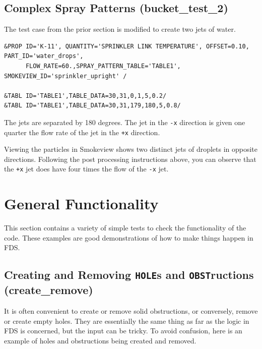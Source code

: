 \documentclass[11pt]{book}
\newcommand{\ct}{\tt\small}
\begin{document}
\normalsize \noindent


\subsection{Complex Spray Patterns ({\bf bucket\_test\_2}) }
\label{bucket_test_2}

The test case from the prior section is modified to create two jets of water.

\footnotesize
\begin{verbatim}
&PROP ID='K-11', QUANTITY='SPRINKLER LINK TEMPERATURE', OFFSET=0.10, PART_ID='water_drops',
      FLOW_RATE=60.,SPRAY_PATTERN_TABLE='TABLE1', SMOKEVIEW_ID='sprinkler_upright' /

&TABL ID='TABLE1',TABLE_DATA=30,31,0,1,5,0.2/
&TABL ID='TABLE1',TABLE_DATA=30,31,179,180,5,0.8/
\end{verbatim}
\normalsize

The jets are separated by 180 degrees.
The jet in the {\ct -x} direction is given one quarter the flow rate of the jet in the {\ct +x} direction.

Viewing the particles in Smokeview shows two distinct jets of droplets in opposite directions.
Following the post processing instructions above,  you can observe that
the {\ct +x} jet does have four times the flow of the {\ct -x} jet.

\clearpage

\section{General Functionality}

This section contains a variety of simple tests to check the functionality of the code. These examples are good demonstrations of how to
make things happen in FDS.


\subsection{Creating and Removing {\ct HOLE}s and {\ct OBST}ructions ({\bf create\_remove}) }
\label{create_remove}

It is often convenient to create or remove solid obstructions, or conversely, remove or create empty holes. They are essentially the same thing as far as the logic in
FDS is concerned, but the input can be tricky. To avoid confusion, here is an example of holes and obstructions being created and removed.
\end{document}
